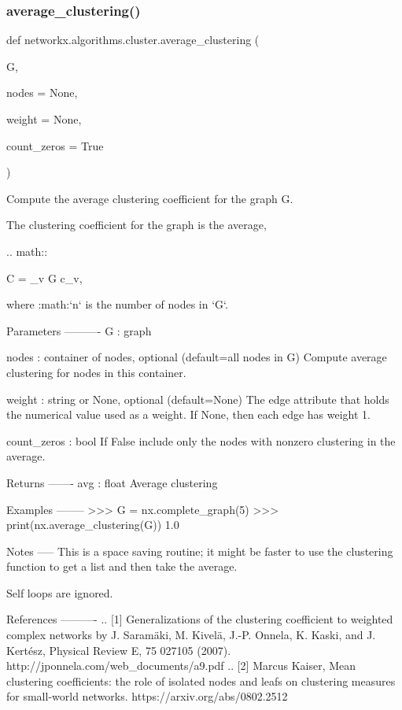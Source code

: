 \subsubsection{\texorpdfstring{average\+\_\+clustering()}{average\_clustering()}}
{\footnotesize\ttfamily def networkx.\+algorithms.\+cluster.\+average\+\_\+clustering (\begin{DoxyParamCaption}\item[{}]{G,  }\item[{}]{nodes = {\ttfamily None},  }\item[{}]{weight = {\ttfamily None},  }\item[{}]{count\+\_\+zeros = {\ttfamily True} }\end{DoxyParamCaption})}

\begin{DoxyVerb}Compute the average clustering coefficient for the graph G.

The clustering coefficient for the graph is the average,

.. math::

   C = \sum_{v \in G} c_v,

where :math:`n` is the number of nodes in `G`.

Parameters
----------
G : graph

nodes : container of nodes, optional (default=all nodes in G)
   Compute average clustering for nodes in this container.

weight : string or None, optional (default=None)
   The edge attribute that holds the numerical value used as a weight.
   If None, then each edge has weight 1.

count_zeros : bool
   If False include only the nodes with nonzero clustering in the average.

Returns
-------
avg : float
   Average clustering

Examples
--------
>>> G = nx.complete_graph(5)
>>> print(nx.average_clustering(G))
1.0

Notes
-----
This is a space saving routine; it might be faster
to use the clustering function to get a list and then take the average.

Self loops are ignored.

References
----------
.. [1] Generalizations of the clustering coefficient to weighted
   complex networks by J. Saramäki, M. Kivelä, J.-P. Onnela,
   K. Kaski, and J. Kertész, Physical Review E, 75 027105 (2007).
   http://jponnela.com/web_documents/a9.pdf
.. [2] Marcus Kaiser,  Mean clustering coefficients: the role of isolated
   nodes and leafs on clustering measures for small-world networks.
   https://arxiv.org/abs/0802.2512
\end{DoxyVerb}
 \mbox{\label{namespacenetworkx_1_1algorithms_1_1cluster_a704bbfd8fc33040ff3cc5234c1b5e059}} 
